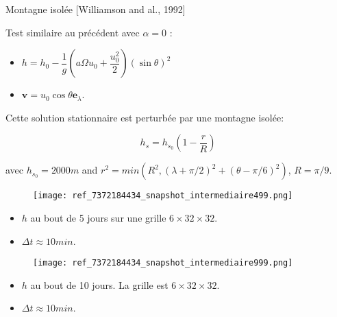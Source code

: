 \documentclass[11pt]{beamer}
\begin{document}
\begin{frame}{Montagne isolée [Williamson and al., 1992]}

\begin{exampleblock}{}
Test similaire au précédent avec $\alpha = 0$ :

\begin{itemize}
\item $h = h_0 - \dfrac{1}{g} \left( a \Omega u_0 + \dfrac{u_0^2}{2} \right)(\sin \theta)^2$
\item $\mathbf{v} = u_0 \cos \theta \mathbf{e}_{\lambda}$.
\end{itemize}

Cette solution stationnaire est perturbée par une montagne isolée:

$$h_s = h_{s_0} \left( 1 - \dfrac{r}{R} \right)$$

avec $h_{s_0}=2000m$ and $r^2=min(R^2, (\lambda + \pi/2)^2+(\theta - \pi/6)^2)$, $R=\pi/9$.
\end{exampleblock}
\end{frame}



\begin{frame}{}
\begin{figure}
\texttt{[image: ref\_7372184434\_snapshot\_intermediaire499.png]}
\end{figure}
\begin{itemize}
\item $h$ au bout de 5 jours sur une grille $6 \times 32 \times 32$.
\item $\Delta t \approx 10min$.
\end{itemize}
\end{frame}



\begin{frame}{}
\begin{figure}
\texttt{[image: ref\_7372184434\_snapshot\_intermediaire999.png]}
\end{figure}
\begin{itemize}
\item $h$ au bout de 10 jours. La grille est $6 \times 32 \times 32$.
\item $\Delta t \approx 10min$.
\end{itemize}
\end{frame}
\end{document}
